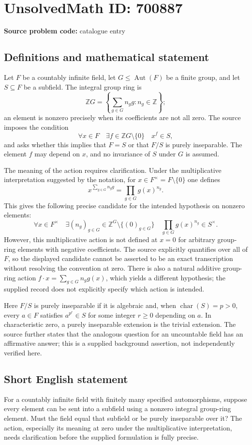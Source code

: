 \documentclass[11pt]{article}
\newcommand{\Z}{\mathbb{Z}}
\begin{document}
\section*{UnsolvedMath ID: 700887}
\textbf{Source problem code:} catalogue entry
\subsection{Definitions and mathematical statement}
Let \(F\) be a countably infinite field, let \(G\leq\operatorname{Aut}(F)\) be a finite group, and let \(S\subseteq F\) be a subfield. The integral group ring is
\[
\Z G=\left\{\sum_{g\in G}n_g g:n_g\in\Z\right\};
\]
an element is nonzero precisely when its coefficients are not all zero. The source imposes the condition
\[
\forall x\in F\quad\exists f\in\Z G\setminus\{0\}\quad x^f\in S,
\]
and asks whether this implies that \(F=S\) or that \(F/S\) is purely inseparable. The element \(f\) may depend on \(x\), and no invariance of \(S\) under \(G\) is assumed.

The meaning of the action requires clarification. Under the multiplicative interpretation suggested by the notation, for \(x\in F^\times=F\setminus\{0\}\) one defines
\[
x^{\sum_{g\in G}n_g g}=\prod_{g\in G}g(x)^{n_g}.
\]
This gives the following precise candidate for the intended hypothesis on nonzero elements:
\[
\forall x\in F^\times\quad\exists (n_g)_{g\in G}\in\Z^G\setminus\{(0)_{g\in G}\}
\quad \prod_{g\in G}g(x)^{n_g}\in S^\times.
\]
However, this multiplicative action is not defined at \(x=0\) for arbitrary group-ring elements with negative coefficients. The source explicitly quantifies over all of \(F\), so the displayed candidate cannot be asserted to be an exact transcription without resolving the convention at zero. There is also a natural additive group-ring action \(f\cdot x=\sum_{g\in G}n_g g(x)\), which yields a different hypothesis; the supplied record does not explicitly specify which action is intended.

Here \(F/S\) is purely inseparable if it is algebraic and, when \(\operatorname{char}(S)=p>0\), every \(a\in F\) satisfies \(a^{p^r}\in S\) for some integer \(r\geq0\) depending on \(a\). In characteristic zero, a purely inseparable extension is the trivial extension. The source further states that the analogous question for an uncountable field has an affirmative answer; this is a supplied background assertion, not independently verified here.
\subsection{Short English statement}
For a countably infinite field with finitely many specified automorphisms, suppose every element can be sent into a subfield using a nonzero integral group-ring element. Must the field equal that subfield or be purely inseparable over it? The action, especially its meaning at zero under the multiplicative interpretation, needs clarification before the supplied formulation is fully precise.
\end{document}
